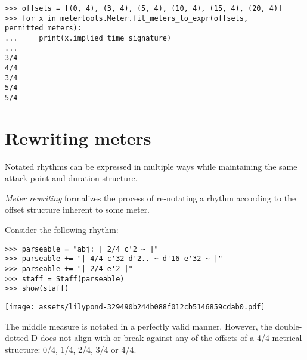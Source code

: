 \begin{singlespacing}
\vspace{-0.5\baselineskip}
\begin{lstlisting}
>>> offsets = [(0, 4), (3, 4), (5, 4), (10, 4), (15, 4), (20, 4)]
>>> for x in metertools.Meter.fit_meters_to_expr(offsets, permitted_meters):
...     print(x.implied_time_signature)
...
3/4
4/4
3/4
5/4
5/4
\end{lstlisting}
\end{singlespacing}

\section{Rewriting meters}

Notated rhythms can be expressed in multiple ways while maintaining the same
attack-point and duration structure.

\emph{Meter rewriting} formalizes the process of re-notating a rhythm according
to the offset structure inherent to some meter.

Consider the following rhythm:

\begin{comment}
<abjad>
parseable = "abj: | 2/4 c'2 ~ |"
parseable += "| 4/4 c'32 d'2.. ~ d'16 e'32 ~ |"
parseable += "| 2/4 e'2 |"
staff = Staff(parseable)
show(staff)
</abjad>
\end{comment}

\begin{singlespacing}
\vspace{-0.5\baselineskip}
\begin{lstlisting}
>>> parseable = "abj: | 2/4 c'2 ~ |"
>>> parseable += "| 4/4 c'32 d'2.. ~ d'16 e'32 ~ |"
>>> parseable += "| 2/4 e'2 |"
>>> staff = Staff(parseable)
>>> show(staff)
\end{lstlisting}
\texttt{[image: assets/lilypond-329490b244b088f012cb5146859cdab0.pdf]}
\end{singlespacing}

The middle measure is notated in a perfectly valid manner. However, the
double-dotted D does not align with or break against any of the offsets of a
4/4 metrical structure: 0/4, 1/4, 2/4, 3/4 or 4/4.

\begin{comment}
<abjad>
meter = metertools.Meter((4, 4))
print(meter.pretty_rtm_format)
graph(meter)
</abjad>
\end{comment}

